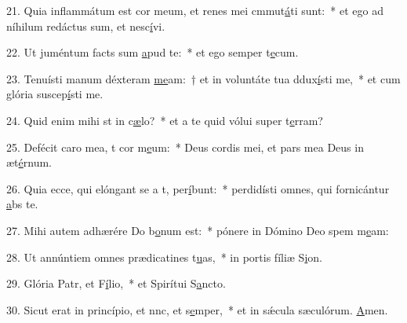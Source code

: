 21. Quia inflammátum est cor meum, et renes mei cmmut\uline{á}ti sunt:~* et ego ad níhilum redáctus sum, et nesc\uline{í}vi.\par 
22. Ut juméntum facts sum \uline{a}pud te:~* et ego semper t\uline{e}cum.\par 
23. Tenuísti manum déxteram \uline{me}am:~† et in voluntáte tua ddux\uline{í}sti me,~* et cum glória suscep\uline{í}sti me.\par 
24. Quid enim mihi st in c\uline{æ}lo?~* et a te quid vólui super t\uline{e}rram?\par 
25. Defécit caro mea, t cor m\uline{e}um:~* Deus cordis mei, et pars mea Deus in æt\uline{é}rnum.\par 
26. Quia ecce, qui elóngant se a t, per\uline{í}bunt:~* perdidísti omnes, qui fornicántur \uline{a}bs te.\par 
27. Mihi autem adhærére Do b\uline{o}num est:~* pónere in Dómino Deo spem m\uline{e}am:\par 
28. Ut annúntiem omnes prædicatines t\uline{u}as,~* in portis fíliæ S\uline{i}on.\par 
29. Glória Patr, et F\uline{í}lio,~* et Spirítui S\uline{a}ncto.\par 
30. Sicut erat in princípio, et nnc, et s\uline{e}mper,~* et in sǽcula sæculórum. \uline{A}men.\par 
